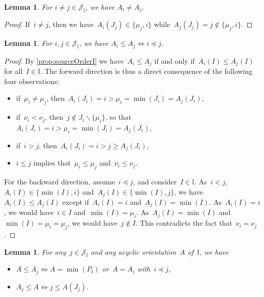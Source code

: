 \documentclass{amsart}
\newtheorem{lemma}[theorem]{Lemma}
\theoremstyle{definition}
\newcommand{\cal}[1]{\mathcal{#1}} %
\newcommand{\ssm}{\smallsetminus} %
\newcommand{\II}{\mathbb I} %
\newcommand{\cJ}{\cal{J}} %
\begin{document}
\begin{lemma}
\label{lem:distinctIrreducibles}
For $i \ne j \in \cJ_\II$, we have $A_i \ne A_j$.
\end{lemma}

\begin{proof}
If~$i \ne j$, then we have~$A_i(J_j) \in \{\mu_j, i\}$ while~$A_j(J_j) = j \notin \{\mu_j,i\}$.
\end{proof}

\begin{lemma}
\label{lem:irrorder}
For $i,j \in \cJ_\II$, we have $A_i \le A_j \iff i \preccurlyeq j$.
\end{lemma}

\begin{proof}
By \cref{prop:sourceOrderI} we have~$A_i \le A_j$ if and only if~$A_i(I) \le A_j(I)$ for all~$I \in \II$.
%
The forward direction is thus a direct consequence of the following four observations:
\begin{itemize}
\item if~$\mu_i \ne \mu_j$, then~$A_i(J_i) = i > \mu_i = \min(J_i) = A_j(J_i)$,
\item if~$\nu_i < \nu_j$, then~$j \notin J_i \ssm \{\mu_i\}$, so that~$A_i(J_i) = i > \mu_i = \min(J_i) = A_j(J_i)$,
\item if~$i > j$, then~$A_i(J_i) = i > j \ge A_j(J_i)$,
\item $i \le j$ implies that~$\mu_i \le \mu_j$ and~$\nu_i \le \nu_j$.
\end{itemize}
%
For the backward direction, assume~$i \preccurlyeq j $, and consider~$I \in \II$.
As~$i < j$, $A_i(I) \in \{\min(I), i\}$ and~$A_j(I) \in \{\min(I), j\}$, we have~$A_i(I) \le A_j(I)$ except if~$A_i(I) = i$ and~$A_j(I) = \min(I)$.
As~$A_i(I) = i$, we would have~$i \in I$ and~$\min(I) = \mu_i$. As~$A_j(I) = \min(I)$ and~$\min(I) = \mu_i = \mu_j$, we would have~$j \notin I$.
This contradicts the fact that~$\nu_i = \nu_j$.
\end{proof}

\begin{lemma}
\label{lem:subirr}
For any~$j \in \cJ_\II$ and any acyclic orientation~$A$ of~$\II$, we have
\begin{itemize}
\item $A \le A_j \iff A = \min(P_\II)$ or~$A = A_i$ with~$i \preccurlyeq j$,
\item $A_j \le A \iff j \le A(J_j)$.
\end{itemize}
\end{lemma}
\end{document}

